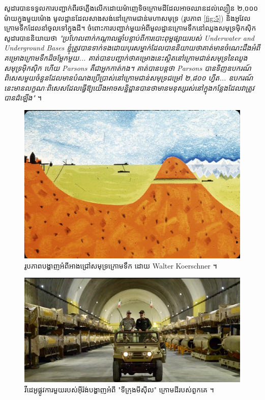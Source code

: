 \documentclass[10pt,twocolumn,letterpaper]{article}
\begin{document}
សូដារបានទទួលការបញ្ជាក់ពីរថភ្លើងលើកដោយម៉ាញេទិចក្រោមដីដែលអាចឈានដល់ល្បឿន ២,០០០ ម៉ាយក្នុងមួយម៉ោង មូលដ្ឋានដែលសាងសង់នៅក្រោមជាន់មហាសមុទ្រ (រូបភាព \ref{fig:5}) និងអូវែលក្រោមទឹកដែលនាំចូលទៅក្នុងដី។ ចំពោះការបញ្ជាក់មួយអំពីមូលដ្ឋានក្រោមទឹកនៅឈូងសមុទ្រម៉ិកស៊ិក សូដារបាននិយាយថា \textit{"ប្រហែលពាក់កណ្តាលឆ្នាំបន្ទាប់ពីការបោះពុម្ពផ្សាយរបស់ Underwater and Underground Bases ខ្ញុំត្រូវបានទាក់ទងដោយបុរសម្នាក់ដែលបាននិយាយថាគាត់មានចំណេះដឹងអំពីគម្រោងក្រោមទឹកដ៏ចម្លែកមួយ... គាត់បានបញ្ជាក់ថាគម្រោងនេះស្ថិតនៅក្រោមជាន់សមុទ្រនៃឈូងសមុទ្រម៉ិកស៊ិក ហើយ Parsons គឺជាអ្នកកាត់កង។ គាត់បានបន្តថា Parsons បានទិញឧបករណ៍ពិសេសមួយចំនួនដែលមានបំណងប្រើប្រាស់នៅក្រោមជាន់សមុទ្រជម្រៅ ២,៨០០ ហ្វីត... ឧបករណ៍នេះមានលក្ខណៈពិសេសដែលធ្វើឱ្យយើងអាចសន្និដ្ឋានបានថាមានមនុស្សរស់នៅក្នុងកន្លែងដែលវាត្រូវបានដំឡើង"} \cite{22}។
\begin{figure}[t]
\begin{center}
   \includegraphics[width=1\linewidth]{sub.jpg}
\end{center}
   \caption{រូបភាពបង្ហាញអំពីអាងជ្រៅសមុទ្រក្រោមទឹក ដោយ Walter Koerschner \cite{22,23}។}
\label{fig:6}
\label{fig:onecol}
\end{figure}
\begin{figure}[t]
\begin{center}
   \includegraphics[width=1\linewidth]{iran.jpeg}
\end{center}
   \caption{វីដេអូផ្លូវការមួយរបស់អ៊ីរ៉ង់បង្ហាញអំពី "ទីក្រុងមីស៊ីល" ក្រោមដីរបស់ពួកគេ \cite{39,40}។}
\label{fig:12}
\label{fig:onecol}
\end{figure}
\end{document}
